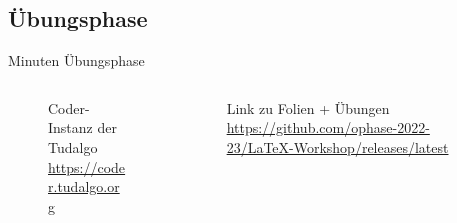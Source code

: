 \documentclass[
    ngerman,
    accentcolor=3b,
    dark_mode,
    fontsize= 12pt,
    a4paper,
    aspectratio=169,
    colorback=true,
    fancy_row_colors,
    leqno,
    fleqn,
    boxarc=3pt,
    fleqn,
]{algoslides}
\begin{document}
    \subsection{Übungsphase}
    \begin{frame}[c]
        \slidehead{}
         Minuten Übungsphase
        \begin{columns}[c]
            \begin{column}{.5\textwidth}
                \begin{figure}
                    \centering
                    \caption{Coder-Instanz der Tudalgo\\\url{https://coder.tudalgo.org}}
                \end{figure}
            \end{column}%
            \begin{column}{.5\textwidth}
                \begin{figure}
                    \centering
                    \caption{Link zu Folien + Übungen\\\url{https://github.com/ophase-2022-23/LaTeX-Workshop/releases/latest}}
                \end{figure}
            \end{column}
        \end{columns}
    \end{frame}
\end{document}
